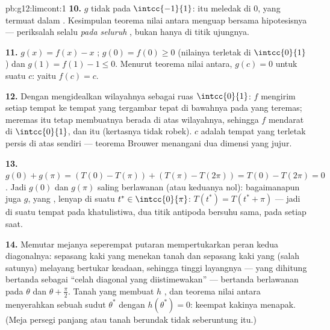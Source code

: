 \begin{solution}{pb:g12:limcont:1}
\textbf{10.} $g$ tidak  pada $\intcc{-1}{1}$:  itu
meledak di $0$, yang termuat dalam . Kesimpulan teorema nilai
antara menguap bersama hipotesisnya --- periksalah selalu
 \emph{pada seluruh }, bukan hanya di
titik ujungnya.

\textbf{11.} $g(x) = f(x) - x$ ;
$g(0) = f(0) \geq 0$ (nilainya terletak di $\intcc{0}{1}$) dan
$g(1) = f(1) - 1 \leq 0$. Menurut teorema nilai antara, $g(c) = 0$ untuk suatu
$c$: yaitu $f(c) = c$.

\textbf{12.} Dengan mengidealkan wilayahnya sebagai ruas
$\intcc{0}{1}$: $f$ mengirim setiap tempat ke tempat yang tergambar
tepat di bawahnya pada  yang teremas; meremas  itu tetap membuatnya
berada di atas wilayahnya, sehingga $f$ mendarat di $\intcc{0}{1}$, dan
 itu  (kertasnya tidak robek).  $c$ adalah
tempat yang terletak persis di atas  sendiri --- teorema Brouwer
menangani  dua dimensi yang jujur.

\textbf{13.} $g(0) + g(\pi) = \left(T(0) - T(\pi)\right) +
\left(T(\pi) - T(2\pi)\right) = T(0) - T(2\pi) = 0$. Jadi
$g(0)$ dan $g(\pi)$ saling berlawanan (atau keduanya nol): bagaimanapun juga
$g$, yang , lenyap di suatu $t^* \in \intcc{0}{\pi}$:
$T(t^*) = T(t^* + \pi)$ --- jadi di suatu tempat pada khatulistiwa, dua
titik antipoda bersuhu sama, pada setiap saat.

\textbf{14.} Memutar mejanya seperempat putaran mempertukarkan
peran kedua diagonalnya: sepasang kaki yang menekan tanah dan sepasang kaki
yang (salah satunya) melayang bertukar keadaan, sehingga tinggi
layangnya --- yang dihitung bertanda sebagai ``celah diagonal yang
diistimewakan'' --- bertanda berlawanan pada $\theta$ dan
$\theta + \frac\pi2$. Tanah yang  membuat $h$ , dan teorema
nilai antara menyerahkan sebuah sudut $\theta^*$ dengan $h(\theta^*) = 0$:
keempat kakinya menapak. (Meja persegi panjang atau tanah berundak tidak
seberuntung itu.)


\end{solution}
